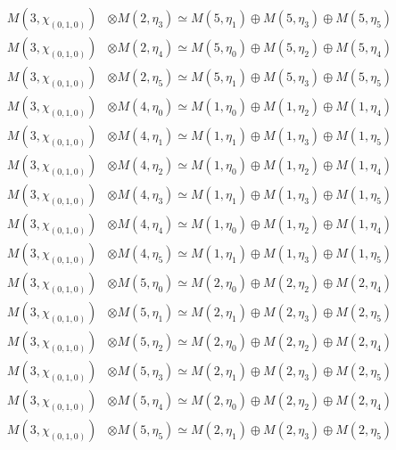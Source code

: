 \begin{align*}
M(3,\chi_{(0,1,0)}) &\otimes M(2,\eta_{3}) \simeq M(5,\eta_{1}) \oplus M(5,\eta_{3}) \oplus M(5,\eta_{5}) \\
M(3,\chi_{(0,1,0)}) &\otimes M(2,\eta_{4}) \simeq M(5,\eta_{0}) \oplus M(5,\eta_{2}) \oplus M(5,\eta_{4}) \\
M(3,\chi_{(0,1,0)}) &\otimes M(2,\eta_{5}) \simeq M(5,\eta_{1}) \oplus M(5,\eta_{3}) \oplus M(5,\eta_{5}) \\
M(3,\chi_{(0,1,0)}) &\otimes M(4,\eta_{0}) \simeq M(1,\eta_{0}) \oplus M(1,\eta_{2}) \oplus M(1,\eta_{4}) \\
M(3,\chi_{(0,1,0)}) &\otimes M(4,\eta_{1}) \simeq M(1,\eta_{1}) \oplus M(1,\eta_{3}) \oplus M(1,\eta_{5}) \\
M(3,\chi_{(0,1,0)}) &\otimes M(4,\eta_{2}) \simeq M(1,\eta_{0}) \oplus M(1,\eta_{2}) \oplus M(1,\eta_{4}) \\
M(3,\chi_{(0,1,0)}) &\otimes M(4,\eta_{3}) \simeq M(1,\eta_{1}) \oplus M(1,\eta_{3}) \oplus M(1,\eta_{5}) \\
M(3,\chi_{(0,1,0)}) &\otimes M(4,\eta_{4}) \simeq M(1,\eta_{0}) \oplus M(1,\eta_{2}) \oplus M(1,\eta_{4}) \\
M(3,\chi_{(0,1,0)}) &\otimes M(4,\eta_{5}) \simeq M(1,\eta_{1}) \oplus M(1,\eta_{3}) \oplus M(1,\eta_{5}) \\
M(3,\chi_{(0,1,0)}) &\otimes M(5,\eta_{0}) \simeq M(2,\eta_{0}) \oplus M(2,\eta_{2}) \oplus M(2,\eta_{4}) \\
M(3,\chi_{(0,1,0)}) &\otimes M(5,\eta_{1}) \simeq M(2,\eta_{1}) \oplus M(2,\eta_{3}) \oplus M(2,\eta_{5}) \\
M(3,\chi_{(0,1,0)}) &\otimes M(5,\eta_{2}) \simeq M(2,\eta_{0}) \oplus M(2,\eta_{2}) \oplus M(2,\eta_{4}) \\
M(3,\chi_{(0,1,0)}) &\otimes M(5,\eta_{3}) \simeq M(2,\eta_{1}) \oplus M(2,\eta_{3}) \oplus M(2,\eta_{5}) \\
M(3,\chi_{(0,1,0)}) &\otimes M(5,\eta_{4}) \simeq M(2,\eta_{0}) \oplus M(2,\eta_{2}) \oplus M(2,\eta_{4}) \\
M(3,\chi_{(0,1,0)}) &\otimes M(5,\eta_{5}) \simeq M(2,\eta_{1}) \oplus M(2,\eta_{3}) \oplus M(2,\eta_{5}) \\
\end{align*}

